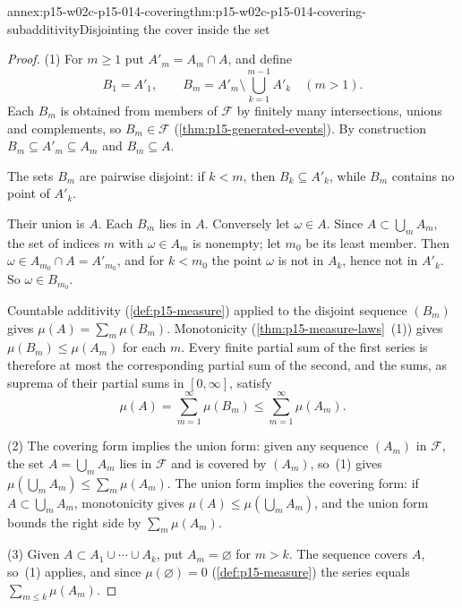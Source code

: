 \begin{annexitem}{annex:p15-w02c-p15-014-covering}{thm:p15-w02c-p15-014-covering-subadditivity}{Disjointing the cover inside the set}
\begin{proof}
(1) For \(m\geq1\) put \(A'_m=A_m\cap A\), and define
\[
 B_1=A'_1,\qquad
 B_m=A'_m\setminus\bigcup_{k=1}^{m-1}A'_k\quad(m>1).
\]
Each \(B_m\) is obtained from members of \(\mathcal F\) by finitely many
intersections, unions and complements, so \(B_m\in\mathcal F\)
(\cref{thm:p15-generated-events}). By construction
\(B_m\subseteq A'_m\subseteq A_m\) and \(B_m\subseteq A\).

The sets \(B_m\) are pairwise disjoint: if \(k<m\), then
\(B_k\subseteq A'_k\), while \(B_m\) contains no point of \(A'_k\).

Their union is \(A\). Each \(B_m\) lies in \(A\). Conversely let
\(\omega\in A\). Since \(A\subset\bigcup_mA_m\), the set of indices
\(m\) with \(\omega\in A_m\) is nonempty; let \(m_0\) be its least
member. Then \(\omega\in A_{m_0}\cap A=A'_{m_0}\), and for \(k<m_0\) the
point \(\omega\) is not in \(A_k\), hence not in \(A'_k\). So
\(\omega\in B_{m_0}\).

Countable additivity (\cref{def:p15-measure}) applied to the disjoint
sequence \((B_m)\) gives \(\mu(A)=\sum_m\mu(B_m)\). Monotonicity
(\cref{thm:p15-measure-laws}~(1)) gives \(\mu(B_m)\leq\mu(A_m)\) for each
\(m\). Every finite partial sum of the first series is therefore at most
the corresponding partial sum of the second, and the sums, as suprema
of their partial sums in \([0,\infty]\), satisfy
\[
 \mu(A)=\sum_{m=1}^\infty\mu(B_m)\leq\sum_{m=1}^\infty\mu(A_m).
\]

(2) The covering form implies the union form: given any sequence
\((A_m)\) in \(\mathcal F\), the set \(A=\bigcup_mA_m\) lies in
\(\mathcal F\) and is covered by \((A_m)\), so~(1) gives
\(\mu(\bigcup_mA_m)\leq\sum_m\mu(A_m)\). The union form implies the
covering form: if \(A\subset\bigcup_mA_m\), monotonicity gives
\(\mu(A)\leq\mu(\bigcup_mA_m)\), and the union form bounds the right
side by \(\sum_m\mu(A_m)\).

(3) Given \(A\subset A_1\cup\cdots\cup A_k\), put \(A_m=\varnothing\) for
\(m>k\). The sequence covers \(A\), so~(1) applies, and since
\(\mu(\varnothing)=0\) (\cref{def:p15-measure}) the series equals
\(\sum_{m\leq k}\mu(A_m)\).
\end{proof}
\end{annexitem}

